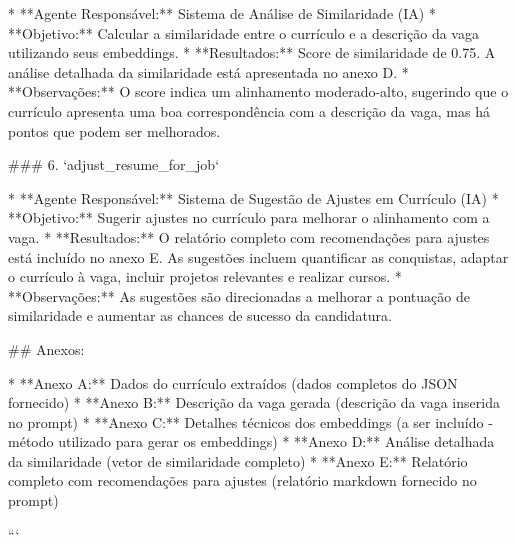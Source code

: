 * **Agente Responsável:** Sistema de Análise de Similaridade (IA)
* **Objetivo:** Calcular a similaridade entre o currículo e a descrição da vaga utilizando seus embeddings.
* **Resultados:** Score de similaridade de 0.75.  A análise detalhada da similaridade está apresentada no anexo D.
* **Observações:**  O score indica um alinhamento moderado-alto, sugerindo que o currículo apresenta uma boa correspondência com a descrição da vaga, mas há pontos que podem ser melhorados.

### 6. `adjust_resume_for_job`

* **Agente Responsável:** Sistema de Sugestão de Ajustes em Currículo (IA)
* **Objetivo:** Sugerir ajustes no currículo para melhorar o alinhamento com a vaga.
* **Resultados:** O relatório completo com recomendações para ajustes está incluído no anexo E.  As sugestões incluem quantificar as conquistas, adaptar o currículo à vaga, incluir projetos relevantes e realizar cursos.
* **Observações:** As sugestões são direcionadas a melhorar a pontuação de similaridade e aumentar as chances de sucesso da candidatura.

## Anexos:

* **Anexo A:** Dados do currículo extraídos (dados completos do JSON fornecido)
* **Anexo B:** Descrição da vaga gerada (descrição da vaga inserida no prompt)
* **Anexo C:** Detalhes técnicos dos embeddings (a ser incluído - método utilizado para gerar os embeddings)
* **Anexo D:** Análise detalhada da similaridade (vetor de similaridade completo)
* **Anexo E:** Relatório completo com recomendações para ajustes (relatório markdown fornecido no prompt)

```